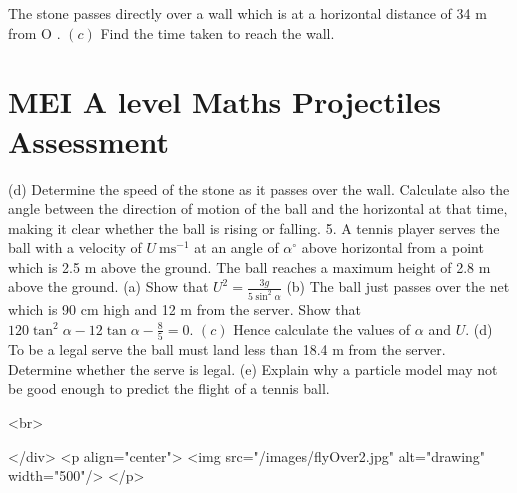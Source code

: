 The stone passes directly over a wall which is at a horizontal distance of 34 m from O .
\((c)\) Find the time taken to reach the wall.

\section*{MEI A level Maths Projectiles Assessment}
(d) Determine the speed of the stone as it passes over the wall. Calculate also the angle between the direction of motion of the ball and the horizontal at that time, making it clear whether the ball is rising or falling.
5. A tennis player serves the ball with a velocity of $U \mathrm{~ms}^{-1}$ at an angle of $\alpha^{\circ}$ above horizontal from a point which is 2.5 m above the ground. The ball reaches a maximum height of 2.8 m above the ground.
(a) Show that $U^{2}=\frac{3 g}{5 \sin ^{2} \alpha}$
(b) The ball just passes over the net which is 90 cm high and 12 m from the server. Show that $120 \tan ^{2} \alpha-12 \tan \alpha-\frac{8}{5}=0$.
\((c)\) Hence calculate the values of $\alpha$ and $U$.
(d) To be a legal serve the ball must land less than 18.4 m from the server. Determine whether the serve is legal.
(e) Explain why a particle model may not be good enough to predict the flight of a tennis ball.

<br>

</div>
<p align="center">
<img src="/images/flyOver2.jpg" alt="drawing" width="500"/>
</p>